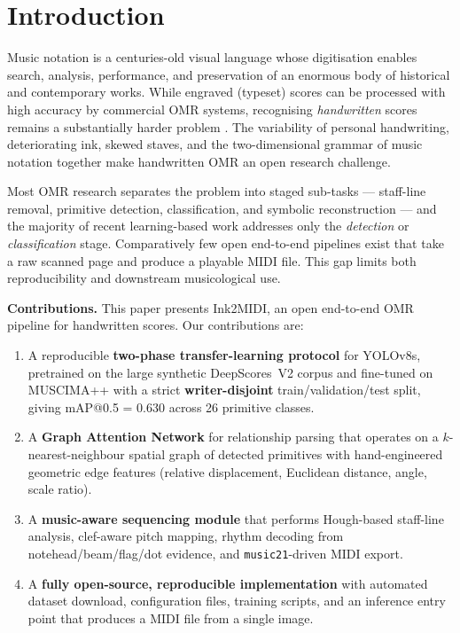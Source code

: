 \documentclass[conference]{IEEEtran}
\begin{document}
\section{Introduction}
Music notation is a centuries-old visual language whose digitisation enables
search, analysis, performance, and preservation of an enormous body of
historical and contemporary works. While engraved (typeset) scores can be
processed with high accuracy by commercial OMR systems, recognising
\emph{handwritten} scores remains a substantially harder problem
\cite{calvo2020understanding,shatri2020optical}. The variability of personal
handwriting, deteriorating ink, skewed staves, and the
two-dimensional grammar of music notation together make handwritten OMR an
open research challenge.

Most OMR research separates the problem into staged sub-tasks --- staff-line
removal, primitive detection, classification, and symbolic reconstruction
\cite{rebelo2012optical} --- and the majority of recent learning-based work
\cite{baro2019handwritten,pacha2018handwritten} addresses only the
\emph{detection} or \emph{classification} stage. Comparatively few open
end-to-end pipelines exist that take a raw scanned page and produce a playable
MIDI file. This gap limits both reproducibility and downstream
musicological use.

\textbf{Contributions.} This paper presents Ink2MIDI, an open end-to-end OMR
pipeline for handwritten scores. Our contributions are:
\begin{enumerate}
    \item A reproducible \textbf{two-phase transfer-learning protocol} for
    YOLOv8s, pretrained on the large synthetic DeepScores~V2 corpus and
    fine-tuned on MUSCIMA++ with a strict \textbf{writer-disjoint}
    train/validation/test split, giving mAP@0.5 = 0.630 across 26 primitive
    classes.
    \item A \textbf{Graph Attention Network} for relationship parsing that
    operates on a $k$-nearest-neighbour spatial graph of detected primitives
    with hand-engineered geometric edge features (relative displacement,
    Euclidean distance, angle, scale ratio).
    \item A \textbf{music-aware sequencing module} that performs Hough-based
    staff-line analysis, clef-aware pitch mapping, rhythm decoding from
    notehead/beam/flag/dot evidence, and \texttt{music21}-driven MIDI export.
    \item A \textbf{fully open-source, reproducible implementation} with
    automated dataset download, configuration files, training scripts, and an
    inference entry point that produces a MIDI file from a single image.
\end{enumerate}
\end{document}
